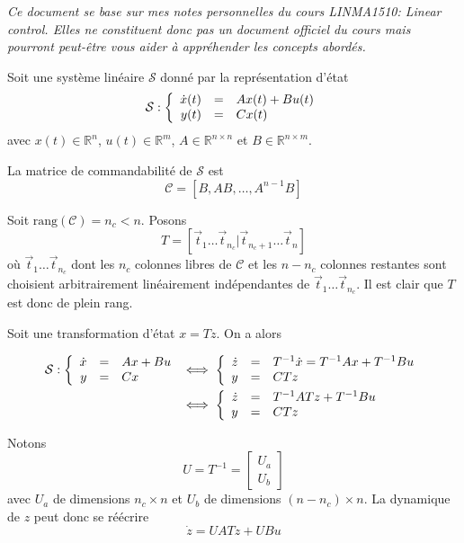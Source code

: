 \documentclass[10pt,letterpaper]{article}
\begin{document}
\textit{Ce document se base sur mes notes personnelles du cours LINMA1510: Linear control. Elles ne constituent donc pas un document officiel du cours mais pourront peut-être vous aider à appréhender les concepts abordés.}
\vspace{.5cm}

Soit une système linéaire $\mathcal{S}$ donné par la représentation d'état
\begin{equation}
	\mathcal{S} :
    \left\{
\begin{array}{r c l}
\dot{x}(t) &=& A x(t) + B u(t) \\
y(t) &=& C x(t)
\end{array}
\right.
\label{eqn:ss}
\end{equation}
avec $x(t)\in \mathbb{R}^n$, $u(t)\in \mathbb{R}^m$, $A\in \mathbb{R}^{n\times n}$ et $B\in \mathbb{R}^{n\times m}$.  

La matrice de commandabilité de $\mathcal{S}$ est
$$ \mathcal{C} = \left[ B, AB, \dots, A^{n-1}B \right] $$ 

Soit $\text{rang}(\mathcal{C}) = n_c < n$. Posons
$$T = \left[ \vec{t}_1 \dots \vec{t}_{n_c} | \vec{t}_{n_c+1} \dots \vec{t}_n \right]$$
où $\vec{t}_1 \dots \vec{t}_{n_c}$ dont les $n_c$ colonnes libres de $\mathcal{C}$ et les $n-n_c$ colonnes restantes sont choisient arbitrairement linéairement indépendantes de $\vec{t}_1 \dots \vec{t}_{n_c}$. Il est clair que $T$ est donc de plein rang.

Soit une transformation d'état $x = Tz$. On a alors

\begin{align*}
\mathcal{S}: \left\{
\begin{array}{r c l}
\dot{x} &=& A x + B u \\
y &=& C x
\end{array}
\right.
&\iff 
\left\{
\begin{array}{r c l}
\dot{z} &=& T^{-1} \dot{x} = T^{-1}Ax +T^{-1} B u \\
y &=& C Tz
\end{array}
\right. \\
&\iff
\left\{
\begin{array}{r c l}
\dot{z} &=& T^{-1}A T z +T^{-1} B u \\
y &=& C Tz
\end{array}
\right.
\end{align*}

Notons 
$$U = T^{-1} = 
\begin{bmatrix}
U_a \\ U_b
\end{bmatrix}
$$
avec $U_a$ de dimensions $n_c\times n$ et $U_b$ de dimensions $(n-n_c)\times n$.
La dynamique de $z$ peut donc se réécrire
\begin{equation}
\dot{z} = UAT z + UB u
\label{dynz}
\end{equation}
\end{document}
